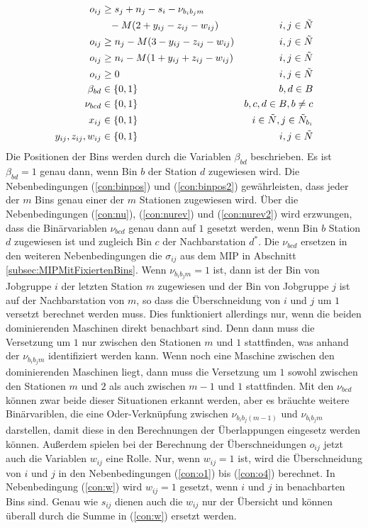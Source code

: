 \documentclass{scrreprt}
\begin{document}
\begin{align}
    o_{ij} &\geq s_j + n_j - s_i - \nu_{b_ib_jm} \notag \\
           &\phantom{\geq} - M(2+y_{ij}-z_{ij}-w_{ij}) &i,j\in\tilde{N} \\
    o_{ij} &\geq n_j - M(3-y_{ij}-z_{ij}-w_{ij}) &i,j\in\tilde{N} \\
	o_{ij} &\geq n_i - M(1+y_{ij}+z_{ij}-w_{ij}) &i,j\in\tilde{N} \label{con:o4} \\
    o_{ij} &\geq 0 &i,j\in\tilde{N} \\
	\beta_{bd} &\in \{0,1\} &b,d\in B \\
	\nu_{bcd} &\in \{0,1\} &b,c,d\in B, b\neq c \\
    x_{ij} &\in \{0,1\} &i\in\tilde{N},j\in\tilde{N}_{b_i} \\
    y_{ij},z_{ij},w_{ij} &\in \{0,1\} &i,j\in\tilde{N}
\end{align}
Die Positionen der Bins werden durch die Variablen $\beta_{bd}$ beschrieben.
Es ist $\beta_{bd}=1$ genau dann, wenn Bin $b$ der Station $d$ zugewiesen wird.
Die Nebenbedingungen (\ref{con:binpos}) und (\ref{con:binpos2}) gewährleisten, dass jeder der $m$ Bins genau einer der $m$ Stationen zugewiesen wird.
Über die Nebenbedingungen (\ref{con:nu}), (\ref{con:nurev}) und (\ref{con:nurev2}) wird erzwungen, dass die Binärvariablen
$\nu_{bcd}$ genau dann auf $1$ gesetzt werden, wenn Bin $b$ Station $d$ zugewiesen ist und zugleich Bin $c$ der Nachbarstation $d^*$.
Die $\nu_{bcd}$ ersetzen in den weiteren Nebenbedingungen die $\sigma_{ij}$ aus dem MIP in Abschnitt \ref{subsec:MIPMitFixiertenBins}.
Wenn $\nu_{b_ib_jm}=1$ ist, dann ist der Bin von Jobgruppe $i$ der letzten Station $m$ zugewiesen und der Bin von Jobgruppe $j$ ist auf der Nachbarstation von $m$,
so dass die Überschneidung von $i$ und $j$ um $1$ versetzt berechnet werden muss.
Dies funktioniert allerdings nur, wenn die beiden dominierenden Maschinen direkt benachbart sind.
Denn dann muss die Versetzung um $1$ nur zwischen den Stationen $m$ und $1$ stattfinden, was anhand der $\nu_{b_ib_jm}$ identifiziert werden kann.
Wenn noch eine Maschine zwischen den dominierenden Maschinen liegt, dann muss die Versetzung um $1$ sowohl zwischen den Stationen $m$ und $2$ als auch zwischen
$m-1$ und $1$ stattfinden. Mit den $\nu_{bcd}$ können zwar beide dieser Situationen erkannt werden, aber 
es bräuchte weitere Binärvariblen, die eine Oder-Verknüpfung zwischen $\nu_{b_ib_j(m-1)}$ und $\nu_{b_ib_jm}$ darstellen, 
damit diese in den Berechnungen der Überlappungen eingesetz werden können.
Außerdem spielen bei der Berechnung der Überschneidungen $o_{ij}$ jetzt auch die Variablen $w_{ij}$ eine Rolle.
Nur, wenn $w_{ij}=1$ ist, wird die Überschneidung von $i$ und $j$ in den Nebenbedingungen (\ref{con:o1}) bis (\ref{con:o4}) berechnet.
In Nebenbedingung (\ref{con:w}) wird $w_{ij}=1$ gesetzt, wenn $i$ und $j$ in benachbarten Bins sind.
Genau wie $s_{ij}$ dienen auch die $w_{ij}$ nur der Übersicht und können überall durch die Summe in (\ref{con:w}) ersetzt werden.
\end{document}
